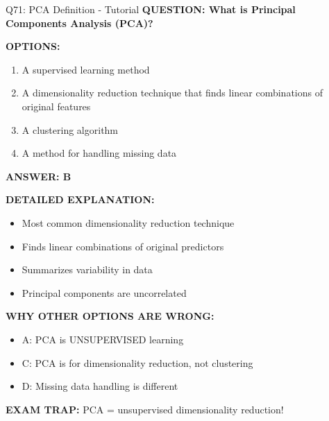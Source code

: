 \documentclass[8pt]{beamer}
\begin{document}
	\begin{frame}{Q71: PCA Definition - Tutorial}
		\fontsize{6.5}{7.5}\selectfont
		\textbf{QUESTION: What is Principal Components Analysis (PCA)?}
		
		\vspace{0.1cm}
		\textbf{OPTIONS:}
		\begin{enumerate}
			\item A supervised learning method
			\item A dimensionality reduction technique that finds linear combinations of original features
			\item A clustering algorithm
			\item A method for handling missing data
		\end{enumerate}
		
		\vspace{0.1cm}
		\textcolor{myblue}{\textbf{ANSWER: B}}
		
		\vspace{0.1cm}
		\textbf{DETAILED EXPLANATION:}
		\begin{itemize}
			\item Most common dimensionality reduction technique
			\item Finds linear combinations of original predictors
			\item Summarizes variability in data
			\item Principal components are uncorrelated
		\end{itemize}
		
		\vspace{0.1cm}
		\textcolor{myred}{\textbf{WHY OTHER OPTIONS ARE WRONG:}}
		\begin{itemize}
			\item \textcolor{myred}{A:} PCA is UNSUPERVISED learning
			\item \textcolor{myred}{C:} PCA is for dimensionality reduction, not clustering
			\item \textcolor{myred}{D:} Missing data handling is different
		\end{itemize}
		
		\textcolor{myred}{\textbf{EXAM TRAP:}} PCA = \textcolor{myblue}{unsupervised dimensionality reduction}!
	\end{frame}
	
\end{document}

